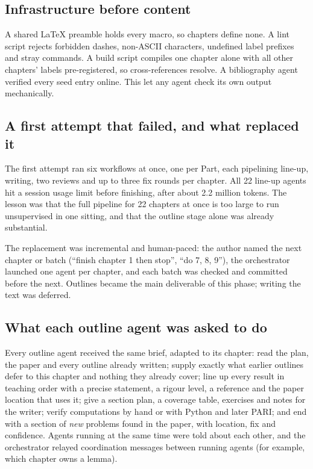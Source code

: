 \documentclass[11pt]{article}
\begin{document}
\subsection{Infrastructure before content}
A shared LaTeX preamble holds every macro, so chapters define none. A lint script rejects forbidden dashes,
non-ASCII characters, undefined label prefixes and stray commands. A build script compiles one chapter alone
with all other chapters' labels pre-registered, so cross-references resolve. A bibliography agent verified every
seed entry online. This let any agent check its own output mechanically.

\subsection{A first attempt that failed, and what replaced it}
The first attempt ran six workflows at once, one per Part, each pipelining line-up, writing, two reviews and up to
three fix rounds per chapter. All 22 line-up agents hit a session usage limit before finishing, after about 2.2
million tokens. The lesson was that the full pipeline for 22 chapters at once is too large to run unsupervised in
one sitting, and that the outline stage alone was already substantial.

The replacement was incremental and human-paced: the author named the next chapter or batch (``finish chapter 1
then stop'', ``do 7, 8, 9''), the orchestrator launched one agent per chapter, and each batch was checked and
committed before the next. Outlines became the main deliverable of this phase; writing the text was deferred.

\subsection{What each outline agent was asked to do}
Every outline agent received the same brief, adapted to its chapter: read the plan, the paper and every outline
already written; supply exactly what earlier outlines defer to this chapter and nothing they already cover; line
up every result in teaching order with a precise statement, a rigour level, a reference and the paper location
that uses it; give a section plan, a coverage table, exercises and notes for the writer; verify computations by
hand or with Python and later PARI; and end with a section of \emph{new} problems found in the paper, with
location, fix and confidence. Agents running at the same time were told about each other, and the orchestrator
relayed coordination messages between running agents (for example, which chapter owns a lemma).
\end{document}
